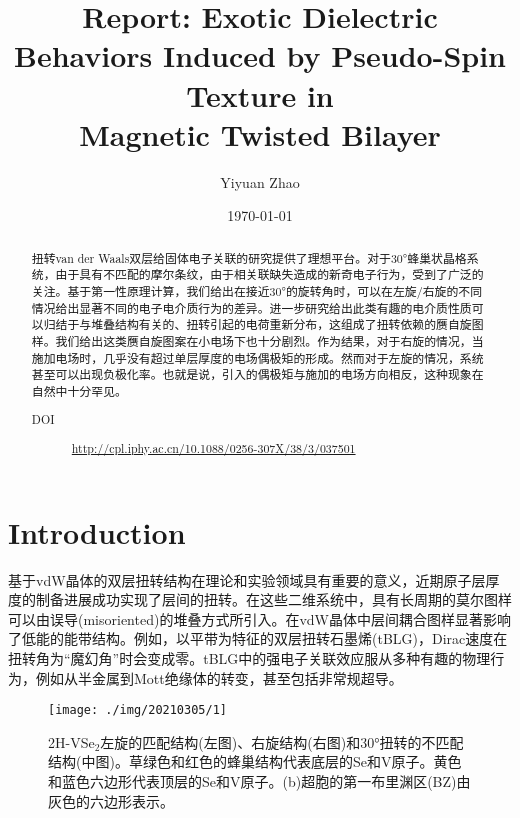 \documentclass[reprint, aps, prb, showkeys]{revtex4-2}
\begin{document}
\title{Report: Exotic Dielectric Behaviors Induced by Pseudo-Spin Texture in \\
Magnetic Twisted Bilayer}

\author{Yiyuan Zhao}
\date{\today}

\begin{abstract}
扭转van der Waals双层给固体电子关联的研究提供了理想平台。对于30°蜂巢状晶格系统，由于具有不匹配的摩尔条纹，由于相关联缺失造成的新奇电子行为，受到了广泛的关注。基于第一性原理计算，我们给出在接近30°的旋转角时，可以在左旋/右旋的不同情况给出显著不同的电子电介质行为的差异。进一步研究给出此类有趣的电介质性质可以归结于与堆叠结构有关的、扭转引起的电荷重新分布，这组成了扭转依赖的赝自旋图样。我们给出这类赝自旋图案在小电场下也十分剧烈。作为结果，对于右旋的情况，当施加电场时，几乎没有超过单层厚度的电场偶极矩的形成。然而对于左旋的情况，系统甚至可以出现负极化率。也就是说，引入的偶极矩与施加的电场方向相反，这种现象在自然中十分罕见。
\begin{description}
    \item[DOI] \url{http://cpl.iphy.ac.cn/10.1088/0256-307X/38/3/037501}
\end{description}
\end{abstract}


\maketitle

\section{Introduction}
基于vdW晶体的双层扭转结构在理论和实验领域具有重要的意义，近期原子层厚度的制备进展成功实现了层间的扭转。在这些二维系统中，具有长周期的莫尔图样可以由误导(misoriented)的堆叠方式所引入。在vdW晶体中层间耦合图样显著影响了低能的能带结构。例如，以平带为特征的双层扭转石墨烯(tBLG)，Dirac速度在扭转角为“魔幻角”时会变成零。tBLG中的强电子关联效应服从多种有趣的物理行为，例如从半金属到Mott绝缘体的转变，甚至包括非常规超导。

\begin{figure*}[t]
    \texttt{[image: ./img/20210305/1]}
    \caption{\label{fig:structure} 
    2H-VSe$_2$左旋的匹配结构(左图)、右旋结构(右图)和30°扭转的不匹配结构(中图)。草绿色和红色的蜂巢结构代表底层的Se和V原子。黄色和蓝色六边形代表顶层的Se和V原子。(b)超胞的第一布里渊区(BZ)由灰色的六边形表示。
    }
\end{figure*}
\end{document}
